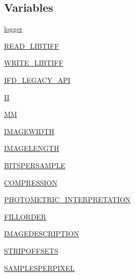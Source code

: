 \subsection*{Variables}
\begin{DoxyCompactItemize}
\item 
\hyperlink{namespacePIL_1_1TiffImagePlugin_a5ecc61ab32625ca873830a820aa5735c}{logger}
\item 
\hyperlink{namespacePIL_1_1TiffImagePlugin_aa2916889101c0f0828bbff5588a684a4}{R\+E\+A\+D\+\_\+\+L\+I\+B\+T\+I\+FF}
\item 
\hyperlink{namespacePIL_1_1TiffImagePlugin_a936ed2a07936f5aac99c16cb692a07ae}{W\+R\+I\+T\+E\+\_\+\+L\+I\+B\+T\+I\+FF}
\item 
\hyperlink{namespacePIL_1_1TiffImagePlugin_adc86f19b4169e1c03680e628dcb8d429}{I\+F\+D\+\_\+\+L\+E\+G\+A\+C\+Y\+\_\+\+A\+PI}
\item 
\hyperlink{namespacePIL_1_1TiffImagePlugin_aa98a114dbdb70a43a3db4bfe758de71c}{II}
\item 
\hyperlink{namespacePIL_1_1TiffImagePlugin_ac6be939a9c79b505d7bb77c8a5cfde31}{MM}
\item 
\hyperlink{namespacePIL_1_1TiffImagePlugin_a61457f20f9a4da693df8de82f67b038a}{I\+M\+A\+G\+E\+W\+I\+D\+TH}
\item 
\hyperlink{namespacePIL_1_1TiffImagePlugin_ac61e1dcc5da0c8a586e134f6bdac8ff9}{I\+M\+A\+G\+E\+L\+E\+N\+G\+TH}
\item 
\hyperlink{namespacePIL_1_1TiffImagePlugin_a334ad0edded6feebc9b503f9d7c274a4}{B\+I\+T\+S\+P\+E\+R\+S\+A\+M\+P\+LE}
\item 
\hyperlink{namespacePIL_1_1TiffImagePlugin_a7e521af81fecf2e4fae851637b2a265e}{C\+O\+M\+P\+R\+E\+S\+S\+I\+ON}
\item 
\hyperlink{namespacePIL_1_1TiffImagePlugin_aed312d2258c514f7b3ab58d5faf624d6}{P\+H\+O\+T\+O\+M\+E\+T\+R\+I\+C\+\_\+\+I\+N\+T\+E\+R\+P\+R\+E\+T\+A\+T\+I\+ON}
\item 
\hyperlink{namespacePIL_1_1TiffImagePlugin_ad9cc574b4710879dd50b37c8ea08c25e}{F\+I\+L\+L\+O\+R\+D\+ER}
\item 
\hyperlink{namespacePIL_1_1TiffImagePlugin_a71cddcfaf41660ee9fdc828bebb621da}{I\+M\+A\+G\+E\+D\+E\+S\+C\+R\+I\+P\+T\+I\+ON}
\item 
\hyperlink{namespacePIL_1_1TiffImagePlugin_ad208fdabdefaf8d2205d093e78c2896c}{S\+T\+R\+I\+P\+O\+F\+F\+S\+E\+TS}
\item 
\hyperlink{namespacePIL_1_1TiffImagePlugin_ad1425f93c6fd1c973a8ee6ce94a291df}{S\+A\+M\+P\+L\+E\+S\+P\+E\+R\+P\+I\+X\+EL}

\end{DoxyCompactItemize}
